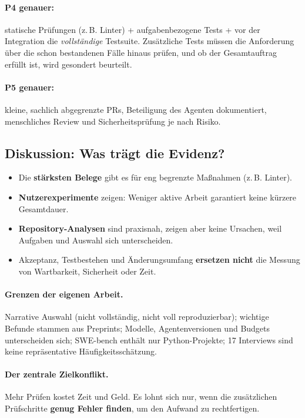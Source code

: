 \documentclass[11pt,a4paper,parskip=half]{scrartcl}
\begin{document}
\paragraph{P4 genauer:} statische Prüfungen (z.\,B. Linter) + aufgabenbezogene Tests + vor der Integration die \emph{vollständige} Testsuite. Zusätzliche Tests müssen die Anforderung über die schon bestandenen Fälle hinaus prüfen, und ob der Gesamtauftrag erfüllt ist, wird gesondert beurteilt.

\paragraph{P5 genauer:} kleine, sachlich abgegrenzte PRs, Beteiligung des Agenten dokumentiert, menschliches Review und Sicherheitsprüfung je nach Risiko.

\subsection{Diskussion: Was trägt die Evidenz?}
\begin{itemize}
\item Die \textbf{stärksten Belege} gibt es für eng begrenzte Maßnahmen (z.\,B. Linter).
\item \textbf{Nutzerexperimente} zeigen: Weniger aktive Arbeit garantiert keine kürzere Gesamtdauer.
\item \textbf{Repository-Analysen} sind praxisnah, zeigen aber keine Ursachen, weil Aufgaben und Auswahl sich unterscheiden.
\item Akzeptanz, Testbestehen und Änderungsumfang \textbf{ersetzen nicht} die Messung von Wartbarkeit, Sicherheit oder Zeit.
\end{itemize}

\paragraph{Grenzen der eigenen Arbeit.}
Narrative Auswahl (nicht vollständig, nicht voll reproduzierbar); wichtige Befunde stammen aus Preprints; Modelle, Agentenversionen und Budgets unterscheiden sich; SWE-bench enthält nur Python-Projekte; 17 Interviews sind keine repräsentative Häufigkeitsschätzung.

\paragraph{Der zentrale Zielkonflikt.}
Mehr Prüfen kostet Zeit und Geld. Es lohnt sich nur, wenn die zusätzlichen Prüfschritte \textbf{genug Fehler finden}, um den Aufwand zu rechtfertigen.
\end{document}
